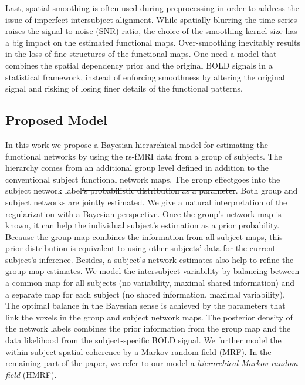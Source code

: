 \documentclass[review,authoryear]{elsarticle}
\providecommand{\DIFadd}[1]{{\protect\color{blue}\uwave{#1}}} %
\providecommand{\DIFdel}[1]{{\protect\color{red}\sout{#1}}}                      %
\providecommand{\DIFaddbegin}{} %
\providecommand{\DIFaddend}{} %
\providecommand{\DIFdelbegin}{} %
\providecommand{\DIFdelend}{} %
\begin{document}
Last, spatial smoothing is often used during preprocessing in order to address
the issue of imperfect intersubject alignment. While spatially blurring the time
series raises the signal-to-noise (SNR) ratio, the choice of the smoothing kernel size
has a big impact on the estimated functional maps. Over-smoothing inevitably
results in the loss of fine structures of the functional maps. One need a model
that combines the spatial dependency prior and the original BOLD signals in a
statistical framework, instead of enforcing smoothness by altering the original
signal and risking of losing finer details of the functional patterns. 

\subsection{Proposed Model}
In this work we propose a Bayesian hierarchical model for estimating the
functional networks by using the rs-fMRI data from a group of subjects. The
hierarchy comes from an additional group level defined in addition to the
conventional subject functional network maps. The group effect\DIFaddbegin \DIFadd{, as a parameter,
}\DIFaddend goes into the \DIFaddbegin \DIFadd{probabilistic distribution of }\DIFaddend subject network label\DIFdelbegin \DIFdel{'s probabilistic distribution as a parameter}\DIFdelend . Both group
and subject networks are jointly estimated. We give a natural interpretation of
the regularization with a Bayesian perspective. Once the group's network map is
known, it can help the individual subject's estimation as a prior probability.
Because the group map combines the information from all subject maps, this prior
distribution is equivalent to using other subjects' data for the current
subject's inference.  Besides, a subject's network estimates also help to refine
the group map estimates. We model the intersubject variability by balancing
between a common map for all subjects (no variability, maximal shared
information) and a separate map for each subject (no shared information, maximal
variability). The optimal balance in the Bayesian sense is achieved by the
parameters that link the voxels in the group and subject network maps.  The
posterior density of the network labels combines the prior information from the
group map and the data likelihood from the subject-specific BOLD signal. We
further model the within-subject spatial coherence by a Markov random field
(MRF). In the remaining part of the paper, we refer to our model a
\emph{hierarchical Markov random field} (HMRF).
\end{document}
